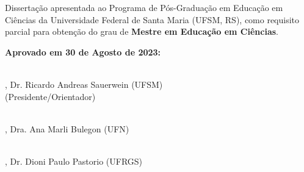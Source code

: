 \begin{folhadeaprovacao}
\center
\begingroup
    \fontsize{12pt}{12pt}\selectfont
    \textbf{\imprimirautor}
\endgroup
\vspace{7em}

\begingroup
    \fontsize{12pt}{12pt}\selectfont
    \textbf{\expandafter\MakeUppercase\expandafter{\imprimirtitulo}}
\endgroup
\vspace{7em}
%
%
\begin{flushright}
\begin{minipage}{.50\textwidth}Dissertação apresentada ao Programa de Pós-Graduação em Educação em Ciências da Universidade Federal de Santa Maria (UFSM, RS), como requisito parcial para obtenção do grau de \textbf{Mestre em Educação em Ciências}.
\end{minipage}
\end{flushright}
\vspace{4em}


\textbf{Aprovado em 30 de Agosto de 2023:}
\vspace{48pt}


\makebox[8cm]{\hrulefill}\\
, Dr. Ricardo Andreas Sauerwein (UFSM)\\
(Presidente/Orientador)
\vspace{1.5em}

\makebox[8cm]{\hrulefill}\\

, Dra. Ana Marli Bulegon (UFN)
\vspace{1.5em}

\makebox[8cm]{\hrulefill}\\
, Dr. Dioni Paulo Pastorio (UFRGS)
\vspace{1.5em}




\vfill

\begingroup
    \fontsize{12pt}{12pt}\selectfont
    \imprimirlocal\\
    \imprimirdata
\endgroup

\end{folhadeaprovacao}
